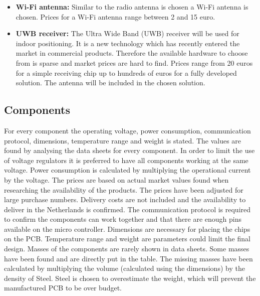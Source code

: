 \begin{itemize}[noitemsep,nolistsep]
    \item \textbf{Wi-Fi antenna:} Similar to the radio antenna is chosen a Wi-Fi antenna is chosen. Prices for a Wi-Fi antenna range between 2 and 15 euro.
    \item \textbf{UWB receiver:} The Ultra Wide Band (UWB) receiver will be used for indoor positioning. It is a new technology which has recently entered the market in commercial products. Therefore the available hardware to choose from is sparse and market prices are hard to find. Prices range from 20 euros for a simple receiving chip up to hundreds of euros for a fully developed solution. The antenna will be included in the chosen solution.
\end{itemize}

\subsection{Components}
\label{subsec:cce_component}
For every component the operating voltage, power consumption, communication protocol, dimensions, temperature range and weight is stated. The values are found by analysing the data sheets for every component. \cite{mouserelectronics, digikey, taoglass, tinyeletronics, U-blox} In order to limit the use of voltage regulators it is preferred to have all components working at the same voltage. Power consumption is calculated by multiplying the operational current by the voltage. The prices are based on actual market values found when researching the availability of the products. The prices have been adjusted for large purchase numbers. Delivery costs are not included and the availability to deliver in the Netherlands is confirmed. The communication protocol is required to confirm the components can work together and that there are enough pins available on the micro controller. Dimensions are necessary for placing the chips on the PCB. Temperature range and weight are parameters could limit the final design. Masses of the components are rarely shown in data sheets. Some masses have been found and are directly put in the table. The missing masses have been calculated by multiplying the volume (calculated using the dimensions) by the density of Steel. Steel is chosen to overestimate the weight, which will prevent the manufactured PCB to be over budget.




